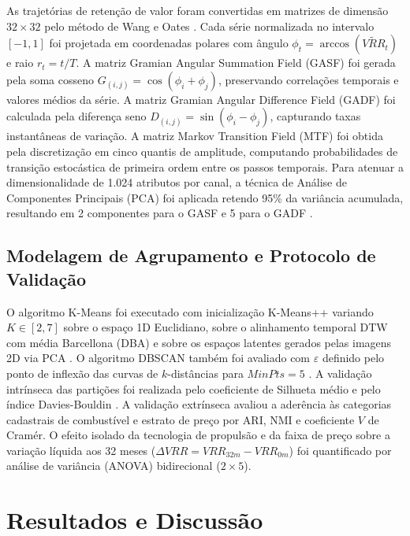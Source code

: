 \documentclass[conference]{IEEEtran}
\begin{document}
As trajetórias de retenção de valor foram convertidas em matrizes de dimensão $32 \times 32$ pelo método de Wang e Oates \cite{wang2015imaging}. Cada série normalizada no intervalo $[-1, 1]$ foi projetada em coordenadas polares com ângulo $\phi_t = \arccos(\widetilde{VRR}_t)$ e raio $r_t = t/T$. A matriz Gramian Angular Summation Field (GASF) foi gerada pela soma cosseno $G_{(i,j)} = \cos(\phi_i + \phi_j)$, preservando correlações temporais e valores médios da série. A matriz Gramian Angular Difference Field (GADF) foi calculada pela diferença seno $D_{(i,j)} = \sin(\phi_i - \phi_j)$, capturando taxas instantâneas de variação. A matriz Markov Transition Field (MTF) foi obtida pela discretização em cinco quantis de amplitude, computando probabilidades de transição estocástica de primeira ordem entre os passos temporais. Para atenuar a dimensionalidade de 1.024 atributos por canal, a técnica de Análise de Componentes Principais (PCA) foi aplicada retendo 95\% da variância acumulada, resultando em 2 componentes para o GASF e 5 para o GADF \cite{tan2019introduction}.

\subsection{Modelagem de Agrupamento e Protocolo de Validação}

O algoritmo K-Means foi executado com inicialização K-Means++ variando $K \in [2, 7]$ sobre o espaço 1D Euclidiano, sobre o alinhamento temporal DTW com média Barcellona (DBA) e sobre os espaços latentes gerados pelas imagens 2D via PCA \cite{arthur2007k, sakoe1978dynamic}. O algoritmo DBSCAN também foi avaliado com $\varepsilon$ definido pelo ponto de inflexão das curvas de $k$-distâncias para $MinPts = 5$ \cite{ester1996density}. A validação intrínseca das partições foi realizada pelo coeficiente de Silhueta médio e pelo índice Davies-Bouldin \cite{rousseeuw1987silhouettes, davies1979cluster}. A validação extrínseca avaliou a aderência às categorias cadastrais de combustível e estrato de preço por ARI, NMI e coeficiente $V$ de Cramér. O efeito isolado da tecnologia de propulsão e da faixa de preço sobre a variação líquida aos 32 meses ($\Delta VRR = VRR_{32m} - VRR_{0m}$) foi quantificado por análise de variância (ANOVA) bidirecional ($2 \times 5$).

\section{Resultados e Discussão}
\end{document}
